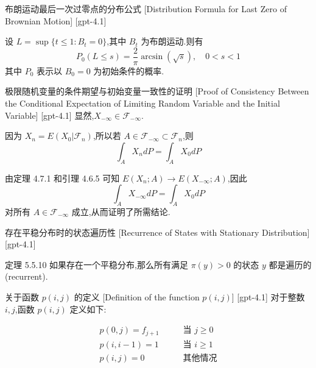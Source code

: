 \documentclass[UTF8]{ctexart}
\begin{document}
    
    
    \begin{thm}
        {布朗运动最后一次过零点的分布公式}
        [Distribution Formula for Last Zero of Brownian Motion]
        [gpt-4.1]
        
设 $L = \operatorname*{sup} \{ t \leq 1 : B_{t} = 0 \}$,其中 $B_t$ 为布朗运动.则有
\[
P_{0} ( L \leq s ) = \frac{2}{\pi} \arcsin ( \sqrt{s} ), \quad 0 < s < 1
\]
其中 $P_0$ 表示以 $B_0 = 0$ 为初始条件的概率.

    \end{thm}
    
    
    
    \begin{prf}
        {极限随机变量的条件期望与初始变量一致性的证明}
        [Proof of Consistency Between the Conditional Expectation of Limiting Random Variable and the Initial Variable]
        [gpt-4.1]
        显然,$X_{-\infty} \in \mathcal{F}_{-\infty}$.

因为 $X_{n} = E(X_{0} | \mathcal{F}_{n})$,所以若 $A \in {\mathcal{F}}_{-\infty} \subset {\mathcal{F}}_{n}$,则
\[
\int_{A} X_{n} dP = \int_{A} X_{0} dP
\]

由定理 4.7.1 和引理 4.6.5 可知 $E(X_{n}; A) \to E(X_{-\infty}; A)$,因此
\[
\int_{A} X_{-\infty} dP = \int_{A} X_{0} dP
\]
对所有 $A \in {\mathcal{F}}_{-\infty}$ 成立,从而证明了所需结论.

    \end{prf}
    
    
    
    \begin{thm}
        {存在平稳分布时的状态遍历性}
        [Recurrence of States with Stationary Distribution]
        [gpt-4.1]
        
定理 5.5.10 如果存在一个平稳分布,那么所有满足 $\pi(y) > 0$ 的状态 $y$ 都是遍历的(recurrent).

    \end{thm}
    
    
    
    \begin{dfn}
        {关于函数 $p(i, j)$ 的定义}
        [Definition of the function $p(i, j)$]
        [gpt-4.1]
        对于整数 $i, j$,函数 $p(i, j)$ 定义如下:

\[
\begin{array}{rl}
p(0, j) = f_{j+1} & \qquad \text{当 } j \geq 0 \\
p(i, i-1) = 1 & \qquad \text{当 } i \geq 1 \\
p(i, j) = 0 & \qquad \text{其他情况}
\end{array}
\]

    \end{dfn}
    
\end{document}
